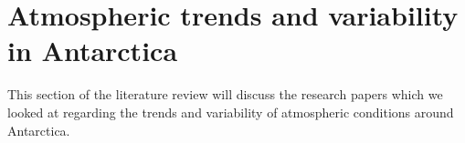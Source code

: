 \section{Atmospheric trends and variability in Antarctica}
This section of the literature review will discuss the research papers which we looked at regarding the trends and variability of atmospheric conditions around Antarctica.